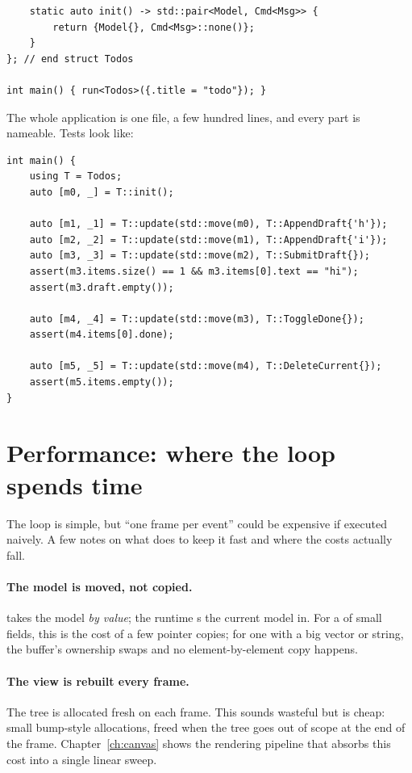 \begin{lstlisting}
    static auto init() -> std::pair<Model, Cmd<Msg>> {
        return {Model{}, Cmd<Msg>::none()};
    }
}; // end struct Todos

int main() { run<Todos>({.title = "todo"}); }
\end{lstlisting}

The whole application is one file, a few hundred lines, and every
part is nameable. Tests look like:

\begin{lstlisting}
int main() {
    using T = Todos;
    auto [m0, _] = T::init();

    auto [m1, _1] = T::update(std::move(m0), T::AppendDraft{'h'});
    auto [m2, _2] = T::update(std::move(m1), T::AppendDraft{'i'});
    auto [m3, _3] = T::update(std::move(m2), T::SubmitDraft{});
    assert(m3.items.size() == 1 && m3.items[0].text == "hi");
    assert(m3.draft.empty());

    auto [m4, _4] = T::update(std::move(m3), T::ToggleDone{});
    assert(m4.items[0].done);

    auto [m5, _5] = T::update(std::move(m4), T::DeleteCurrent{});
    assert(m5.items.empty());
}
\end{lstlisting}

\section{Performance: where the loop spends time}
\label{sec:elm:perf}

The loop is simple, but ``one frame per event'' could be expensive
if executed naively. A few notes on what \maya{} does to keep it
fast and where the costs actually fall.

\paragraph{The model is moved, not copied.}  takes the model \emph{by value}; the runtime
s the current model in. For a  of small
fields, this is the cost of a few pointer copies; for one with a
big vector or string, the buffer's ownership swaps and no
element-by-element copy happens.

\paragraph{The view is rebuilt every frame.} The 
tree is allocated fresh on each frame. This sounds wasteful but is
cheap: small bump-style allocations, freed when the tree goes out of
scope at the end of the frame. Chapter~\ref{ch:canvas} shows the
rendering pipeline that absorbs this cost into a single linear
sweep.

